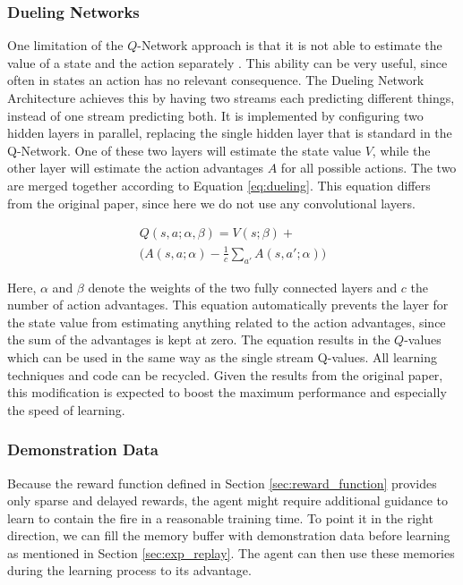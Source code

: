 \subsubsection{Dueling Networks}\label{sec:dueling}
One limitation of the $Q$-Network approach is that it is not able to estimate the value of a state and the action separately \citep{wang2015dueling}. This ability can be very useful, since often in states an action has no relevant consequence. The Dueling Network Architecture achieves this by having two streams each predicting different things, instead of one stream predicting both. It is implemented by configuring two hidden layers in parallel, replacing the single hidden layer that is standard in the Q-Network. One of these two layers will estimate the state value $V$, while the other layer will estimate the action advantages $A$ for all possible actions. The two are merged together according to Equation \eqref{eq:dueling}. This equation differs from the original paper, since here we do not use any convolutional layers.

\begin{equation} \label{eq:dueling}
  \begin{array}{l}
    Q(s,a; \alpha, \beta) = V(s; \beta) + \\ 
    \Big(A(s, a; \alpha) - \frac{1}{c} \sum\limits_{a'} A(s,a'; \alpha)\Big)
  \end{array}
\end{equation}

Here, $\alpha$ and $\beta$ denote the weights of the two fully connected layers and $c$ the number of action advantages. This equation automatically prevents the layer for the state value from estimating anything related to the action advantages, since the sum of the advantages is kept at zero. The equation results in the $Q$-values which can be used in the same way as the single stream Q-values. All learning techniques and code can be recycled. Given the results from the original paper, this modification is expected to boost the maximum performance and especially the speed of learning. 



\subsubsection{Demonstration Data}\label{sec:demo_data}
Because the reward function defined in Section \ref{sec:reward_function} provides only sparse and delayed rewards, the agent might require additional guidance to learn to contain the fire in a reasonable training time. To point it in the right direction, we can fill the memory buffer with demonstration data before learning as mentioned in Section \ref{sec:exp_replay}. The agent can then use these memories during the learning process to its advantage.

